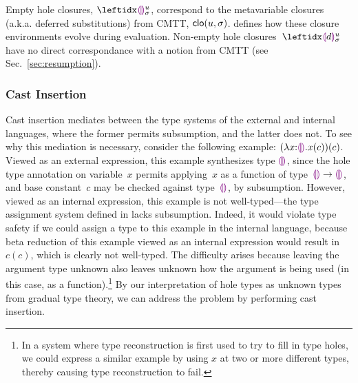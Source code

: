 Empty hole closures, $\dehole{u}{\sigma}{}$,  correspond to the metavariable closures (a.k.a. deferred substitutions) from CMTT, $\mathsf{clo}(u, \sigma)$.
%
 defines how these closure environments evolve during evaluation.
%
Non-empty hole closures~$\dhole{d}{u}{\sigma}{}$ have no direct correspondance with a notion from CMTT (see Sec.~\ref{sec:resumption}).

\subsubsection{Cast Insertion}\label{sec:cast-insertion}
%
%
Cast insertion mediates between the type systems of the external and
internal languages, where the former permits subsumption, and the
latter does not.
%
To see why this mediation is necessary, consider the following
example: $(\lambda x{:}\textcolor{violet}{\llparenthesis}\textcolor{violet}{\rrparenthesis}.x(c))(c)$.
%
Viewed as an external expression, this example synthesizes type
$\textcolor{violet}{\llparenthesis}\textcolor{violet}{\rrparenthesis}$, since the hole type annotation on variable~$x$ permits
applying~$x$ as a function of type~$\textcolor{violet}{\llparenthesis}\textcolor{violet}{\rrparenthesis} \rightarrow \textcolor{violet}{\llparenthesis}\textcolor{violet}{\rrparenthesis}$, and base
constant~$c$ may be checked against type~$\textcolor{violet}{\llparenthesis}\textcolor{violet}{\rrparenthesis}$, by subsumption.
%
However, viewed as an internal expression, this example is not
well-typed---the type assignment system defined in
 lacks subsumption.
%
Indeed, it would violate type safety if we could assign a type to this
example in the internal language, because beta reduction of this
example viewed as an internal expression would result in $c(c)$, which
is clearly not well-typed.
%
The difficulty arises because leaving the argument type unknown also leaves unknown how
the argument is being used (in this case, as a function).\footnote{In a system where type reconstruction is first used
to try to fill in type holes, we could express a similar example by
using $x$ at two or more different types, thereby causing type
reconstruction to fail.
%
}
By our interpretation of hole types as unknown types from gradual type
theory, we can address the problem by performing cast insertion.
%

